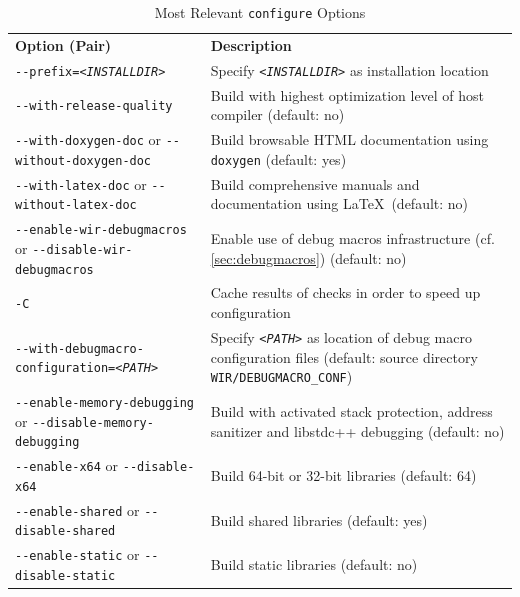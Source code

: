 \begin{table}[!b]
  \begin{center}
    \caption{Most Relevant \texttt{configure} Options}
    \label{tab:configure}
    \begin{tabular}{|p{69mm}|p{96mm}|}
      \hline
      \textbf{Option (Pair)} & \textbf{Description} \\
      \hhline{|=|=|}
      \texttt{\small-{}-prefix=\emph{<INSTALLDIR>}} & Specify \texttt{\emph{<INSTALLDIR>}} as installation location \\
      \hline
      \raggedright \texttt{\small-{}-with-release-quality} & Build with highest optimization level of host compiler (default: no) \\
      \hline
      \raggedright \texttt{\small-{}-with-doxygen-doc} or \texttt{\small-{}-without-doxygen-doc} & Build browsable HTML documentation using \texttt{doxygen} (default: yes) \\
      \hline
      \raggedright \texttt{\small-{}-with-latex-doc} or \texttt{\small-{}-without-latex-doc} & Build comprehensive manuals and documentation using \LaTeX\ (default: no) \\
      \hline
      \raggedright \texttt{\small-{}-enable-wir-debugmacros} or \texttt{\small-{}-disable-wir-debugmacros} & Enable use of debug macros infrastructure (cf. \cref{sec:debugmacros}) (default: no) \\
      \hline
      \texttt{\small-C} & Cache results of checks in order to speed up configuration \\
      \hline
      \texttt{\small-{}-with-debugmacro-configuration=\emph{<PATH>}} & Specify \texttt{\emph{<PATH>}} as location of debug macro configuration files (default: source directory \texttt{WIR/DEBUGMACRO\_CONF}) \\
      \hline
      \raggedright \texttt{\small-{}-enable-memory-debugging} or \texttt{\small-{}-disable-memory-debugging} & Build with activated stack protection, address sanitizer and libstdc++ debugging (default: no) \\
      \hline
      \raggedright \texttt{\small-{}-enable-x64} or \texttt{\small-{}-disable-x64} & Build 64-bit or 32-bit libraries (default: 64) \\
      \hline
      \raggedright \texttt{\small-{}-enable-shared} or \texttt{\small-{}-disable-shared} & Build shared libraries (default: yes) \\
      \hline
      \raggedright \texttt{\small-{}-enable-static} or \texttt{\small-{}-disable-static} & Build static libraries (default: no) \\
      \hline
    \end{tabular}
  \end{center}
\end{table}

